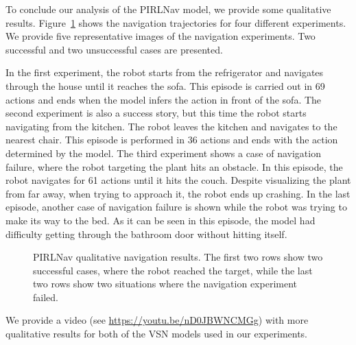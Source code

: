 To conclude our analysis of the PIRLNav model, we provide some qualitative results.
Figure~\ref{fig:pirlnav_qualitative} shows the navigation trajectories for four different experiments.
We provide five representative images of the navigation experiments.
Two successful and two unsuccessful cases are presented.

In the first experiment, the robot starts from the refrigerator and navigates through the house until it reaches the sofa.
This episode is carried out in 69 actions and ends when the model infers the action \stopac in front of the sofa.
The second experiment is also a success story, but this time the robot starts navigating from the kitchen.
The robot leaves the kitchen and navigates to the nearest chair.
This episode is performed in 36 actions and ends with the \stopac action determined by the model.
The third experiment shows a case of navigation failure, where the robot targeting the plant hits an obstacle.
In this episode, the robot navigates for 61 actions until it hits the couch.
Despite visualizing the plant from far away, when trying to approach it, the robot ends up crashing.
In the last episode, another case of navigation failure is shown while the robot was trying to make its way to the bed.
As it can be seen in this episode, the model had difficulty getting through the bathroom door without hitting itself.

\begin{figure}
    \centering
        \caption{PIRLNav qualitative navigation results. The first two rows show two successful cases, where the robot reached the target, while the last two rows show two situations where the navigation experiment failed.}
        \label{fig:pirlnav_qualitative}
\end{figure}

We provide a video (see \url{https://youtu.be/nD0JBWNCMGg}) with more qualitative results for both of the VSN models used in our experiments.

